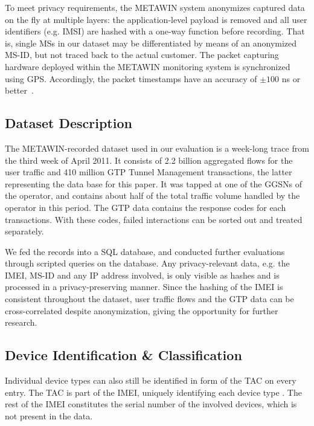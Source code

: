 To meet privacy requirements, the \ac{METAWIN} system anonymizes captured data on the fly at multiple layers: the application-level payload is removed and all user identifiers (e.g. \ac{IMSI}) are hashed with a one-way function before recording. That is, single \acp{MS} in our dataset may be differentiated by means of an anonymized \ac{MS-ID}, but not traced back to the actual customer. The packet capturing hardware deployed within the \ac{METAWIN} monitoring system is synchronized using \ac{GPS}. Accordingly, the packet timestamps have an accuracy of $\pm100$ ns or better~\cite[p.97-98]{donnelly_high_2002}.

\subsection{Dataset Description}


The \ac{METAWIN}-recorded dataset used in our evaluation is a week-long trace from the third week of April 2011. It consists of 2.2 billion aggregated flows for the user traffic and 410 million \ac{GTP} Tunnel Management transactions, the latter representing the data base for this paper. It was tapped at one of the \acp{GGSN} of the operator, and contains about half of the total traffic volume handled by the operator in this period. The \ac{GTP} data contains the response codes for each transactions. With these codes, failed interactions can be sorted out and treated separately.

We fed the records into a SQL database, and conducted further evaluations through scripted queries on the database. Any privacy-relevant data, e.g. the \ac{IMEI}, \ac{MS-ID} and any IP address involved, is only visible as hashes and is processed in a privacy-preserving manner.  Since the hashing of the \ac{IMEI} is consistent throughout the dataset, user traffic flows and the \ac{GTP} data can be cross-correlated despite anonymization, giving the opportunity for further research.


\subsection{Device Identification \& Classification}

Individual device types can also still be identified in form of the \ac{TAC} on every entry. The \ac{TAC} is part of the \ac{IMEI}, uniquely identifying each device type \cite{3gpp23.003}. The rest of the \ac{IMEI} constitutes the serial number of the involved devices, which is not present in the data.

